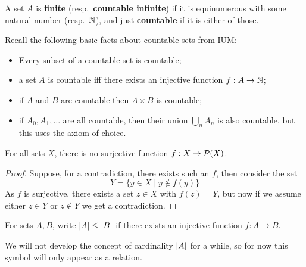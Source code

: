 \documentclass{article}
\begin{document}
\begin{definition}
    A set $A$ is \textbf{finite} (resp.~\textbf{countable infinite}) if it is equinumerous with some natural number (resp.~$\mathbb{N}$), and just \textbf{countable} if it is either of those.
\end{definition}
Recall the following basic facts about countable sets from IUM:\begin{itemize}
    \item Every subset of a countable set is countable;
    \item a set $A$ is countable iff there exists an injective function $f:A\rightarrow \mathbb{N}$;
    \item if $A$ and $B$ are countable then $A\times B$ is countable;
    \item if $A_0,A_1,\ldots$ are all countable, then their union $\bigcup_n A_n$ is also countable, but this uses the axiom of choice.
\end{itemize}

\begin{theorem}[Cantor]
    For all sets $X$, there is no surjective function $f:X\rightarrow \mathcal{P}(X)$. \begin{proof}
        Suppose, for a contradiction, there exists such an $f$, then consider the set \[
        Y = \{y\in X \mid y\not\in f(y)\}
        \] As $f$ is surjective, there exists a set $z\in X$ with $f(z) = Y$, but now if we assume either $z\in Y$ or $z\not\in Y$ we get a contradiction.
    \end{proof}
\end{theorem}

\begin{definition}
    For sets $A,B$, write $\left| A \right|\leq \left| B \right|$ if there exists an injective function $f:A\rightarrow B$.
\end{definition}

We will not develop the concept of cardinality $\left| A \right|$ for a while, so for now this symbol will only appear as a relation.
\end{document}
